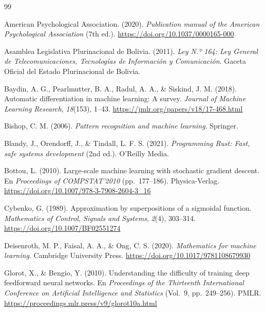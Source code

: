 \begin{thebibliography}{99}

American Psychological Association. (2020). \emph{Publication manual of the American Psychological Association} (7th ed.). \url{https://doi.org/10.1037/0000165-000}

Asamblea Legislativa Plurinacional de Bolivia. (2011). \emph{Ley N.º 164: Ley General de Telecomunicaciones, Tecnologías de Información y Comunicación}. Gaceta Oficial del Estado Plurinacional de Bolivia.

Baydin, A. G., Pearlmutter, B. A., Radul, A. A., \& Siskind, J. M. (2018). Automatic differentiation in machine learning: A survey. \emph{Journal of Machine Learning Research}, \emph{18}(153), 1–43. \url{https://jmlr.org/papers/v18/17-468.html}

Bishop, C. M. (2006). \emph{Pattern recognition and machine learning}. Springer.

Blandy, J., Orendorff, J., \& Tindall, L. F. S. (2021). \emph{Programming Rust: Fast, safe systems development} (2nd ed.). O'Reilly Media.

Bottou, L. (2010). Large-scale machine learning with stochastic gradient descent. En \emph{Proceedings of COMPSTAT'2010} (pp.~177–186). Physica-Verlag. \url{https://doi.org/10.1007/978-3-7908-2604-3_16}

Cybenko, G. (1989). Approximation by superpositions of a sigmoidal function. \emph{Mathematics of Control, Signals and Systems}, \emph{2}(4), 303–314. \url{https://doi.org/10.1007/BF02551274}

Deisenroth, M. P., Faisal, A. A., \& Ong, C. S. (2020). \emph{Mathematics for machine learning}. Cambridge University Press. \url{https://doi.org/10.1017/9781108679930}

Glorot, X., \& Bengio, Y. (2010). Understanding the difficulty of training deep feedforward neural networks. En \emph{Proceedings of the Thirteenth International Conference on Artificial Intelligence and Statistics} (Vol.~9, pp.~249–256). PMLR. \url{https://proceedings.mlr.press/v9/glorot10a.html}


\end{thebibliography}
